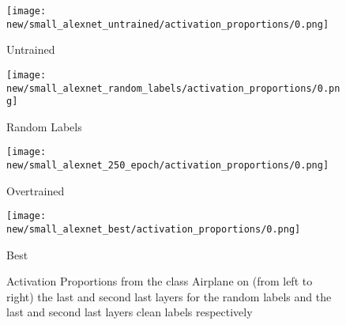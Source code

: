 \documentclass{article}
\begin{document}
            
            \begin{figure}[H]
                \centering
                \begin{minipage}{0.45\textwidth}
                    \centering
                    \texttt{[image: new/small\_alexnet\_untrained/activation\_proportions/0.png]}
                    \caption{Untrained}
                \end{minipage}
                \hfill
                \begin{minipage}{0.45\textwidth}
                    \centering
                    \texttt{[image: new/small\_alexnet\_random\_labels/activation\_proportions/0.png]}
                    \caption{Random Labels}
                \end{minipage}
                \begin{minipage}{0.45\textwidth}
                    \centering
                    \texttt{[image: new/small\_alexnet\_250\_epoch/activation\_proportions/0.png]}
                    \caption{Overtrained}
                \end{minipage}
                \hfill
                \begin{minipage}{0.45\textwidth}
                    \centering
                    \texttt{[image: new/small\_alexnet\_best/activation\_proportions/0.png]}
                    \caption{Best}
                \end{minipage}
                \hfill
                
                \caption{Activation Proportions from the class Airplane on (from left to right) the last and second last layers for the random labels and the last and second last layers clean labels respectively}
                \label{fig:class_airplane}
            \end{figure}
            
\end{document}
